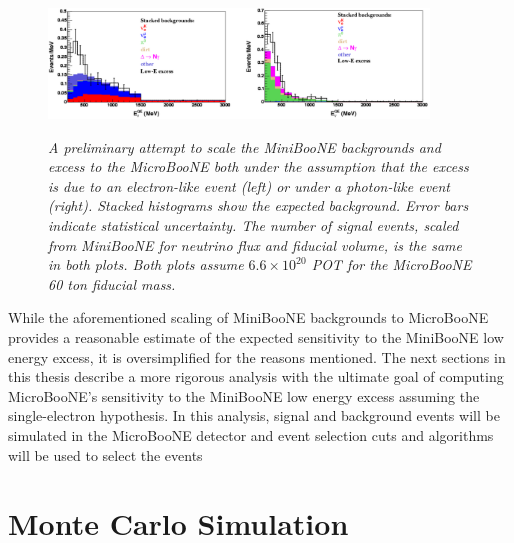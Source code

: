 \begin{figure}[ht!]
\centering
	\includegraphics[width=0.9\textwidth]{Figures/TDR_LEE_scaling.png} \\
\caption{\textit{A preliminary attempt to scale the MiniBooNE backgrounds and excess to the MicroBooNE both under the assumption that the excess is due to an electron-like event (left) or under a photon-like event (right). Stacked histograms show the expected background. Error bars indicate statistical uncertainty. The number of signal events, scaled from MiniBooNE for neutrino flux and fiducial volume, is the same in both plots. Both plots assume $6.6 \times 10^20$ POT for the MicroBooNE 60 ton fiducial mass.}}\label{TDR_LEE_scaling_fig}
\end{figure}

While the aforementioned scaling of MiniBooNE backgrounds to MicroBooNE provides a reasonable estimate of the expected sensitivity to the MiniBooNE low energy excess, it is oversimplified for the reasons mentioned. The next sections in this thesis describe a more rigorous analysis with the ultimate goal of computing MicroBooNE's sensitivity to the MiniBooNE low energy excess assuming the single-electron hypothesis. In this analysis, signal and background events will be simulated in the MicroBooNE detector and event selection cuts and algorithms will be used to select the events














\section{Monte Carlo Simulation}

